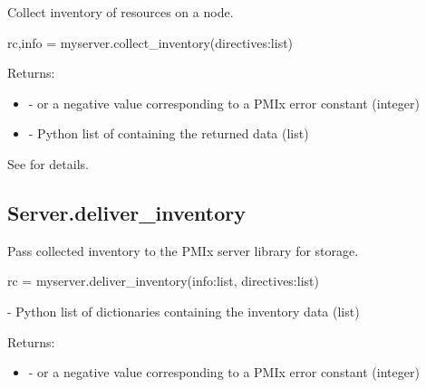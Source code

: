 \summary
Collect inventory of resources on a node.

\format

\pyspecificstart
\begin{codepar}
rc,info = myserver.collect_inventory(directives:list)
\end{codepar}
\pyspecificend


\begin{arglist}
\end{arglist}

Returns:

\begin{itemize}
    \item {} -  or a negative value corresponding to a PMIx error constant (integer)
    \item {} - Python list of  containing the returned data (list)
\end{itemize}

See  for details.


\subsection{Server.deliver_inventory}

\summary
Pass collected inventory to the \ac{PMIx} server library for storage.

\format

\pyspecificstart
\begin{codepar}
rc = myserver.deliver_inventory(info:list, directives:list)
\end{codepar}
\pyspecificend


\begin{arglist}
 - Python list of  dictionaries containing the inventory data (list)
\end{arglist}

Returns:

\begin{itemize}
    \item {} -  or a negative value corresponding to a PMIx error constant (integer)
\end{itemize}

